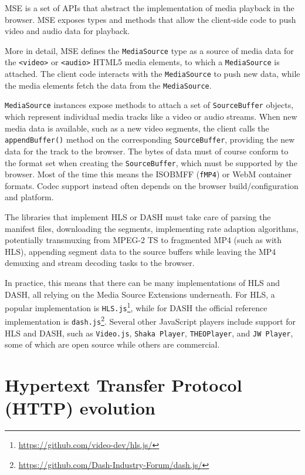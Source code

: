 MSE is a set of APIs that abstract the implementation of media playback in the browser. MSE exposes types and methods that allow the client-side code to push video and audio data for playback.

More in detail, MSE defines the \texttt{MediaSource} type as a source of media data for the \texttt{<video>} or \texttt{<audio>} HTML5 media elements, to which a \texttt{MediaSource} is attached. The client code interacts with the \texttt{MediaSource} to push new data, while the media elements fetch the data from the \texttt{MediaSource}.

\texttt{MediaSource} instances expose methods to attach a set of \texttt{SourceBuffer} objects, which represent individual media tracks like a video or audio streams. When new media data is available, such as a new video segments, the client calls the \texttt{appendBuffer()} method on the corresponding \texttt{SourceBuffer}, providing the new data for the track to the browser. The bytes of data must of course conform to the format set when creating the \texttt{SourceBuffer}, which must be supported by the browser. Most of the time this means the ISOBMFF (\texttt{fMP4}) or WebM container formats. Codec support instead often depends on the browser build/configuration and platform.

The libraries that implement HLS or DASH must take care of parsing the manifest files, downloading the segments, implementing rate adaption algorithms, potentially transmuxing from MPEG-2 TS to fragmented MP4 (such as with HLS), appending segment data to the source buffers while leaving the MP4 demuxing and stream decoding tasks to the browser.

In practice, this means that there can be many implementations of HLS and DASH, all relying on the Media Source Extensions underneath. For HLS, a popular implementation is \texttt{HLS.js}\footnote{\url{https://github.com/video-dev/hls.js/}}, while for DASH the official reference implementation is \texttt{dash.js}\footnote{\url{https://github.com/Dash-Industry-Forum/dash.js/}}. Several other JavaScript players include support for HLS and DASH, such as \texttt{Video.js}, \texttt{Shaka Player}, \texttt{THEOPlayer}, and \texttt{JW Player}, some of which are open source while others are commercial.

\section{Hypertext Transfer Protocol (HTTP) evolution}
\label{sec:bg/http}

